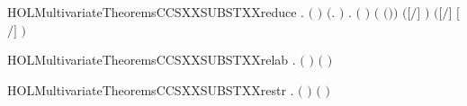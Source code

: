 \begin{SaveVerbatim}{HOLMultivariateTheoremsCCSXXSUBSTXXreduce}
\HOLTokenTurnstile{} \HOLSymConst{\HOLTokenForall{}}   .
       \HOLSymConst{\HOLTokenNeg{}}   \HOLSymConst{\HOLTokenConj{}}   \HOLSymConst{\HOLTokenConj{}} \ensuremath{(}  \HOLSymConst{\ensuremath{=}}  \ensuremath{)} \HOLSymConst{\HOLTokenConj{}}
        \ensuremath{(}\HOLTokenLambda{}.  \HOLConst{\HOLTokenNotIn{}}  \ensuremath{)}  \HOLSymConst{\HOLTokenImp{}}
       \HOLSymConst{\HOLTokenForall{}} .
            \ensuremath{(} \ensuremath{)} \ensuremath{(} \ensuremath{(}\HOLSymConst{::}\ensuremath{)}\ensuremath{)} \HOLSymConst{\HOLTokenConj{}} \ensuremath{(}\ensuremath{[}\ensuremath{/}\ensuremath{]}  \HOLSymConst{\ensuremath{=}} \ensuremath{)} \HOLSymConst{\HOLTokenImp{}}
           \ensuremath{(}\ensuremath{[}\HOLSymConst{::}\ensuremath{/}\HOLSymConst{::}\ensuremath{]}  \HOLSymConst{\ensuremath{=}} \ensuremath{[}\ensuremath{/}\ensuremath{]} \ensuremath{)}
\end{SaveVerbatim}
\newcommand{\HOLMultivariateTheoremsCCSXXSUBSTXXreduce}{\UseVerbatim{HOLMultivariateTheoremsCCSXXSUBSTXXreduce}}
\begin{SaveVerbatim}{HOLMultivariateTheoremsCCSXXSUBSTXXrelab}
\HOLTokenTurnstile{} \HOLSymConst{\HOLTokenForall{}}  .
         \ensuremath{(}  \ensuremath{)} \HOLSymConst{\ensuremath{=}}  \ensuremath{(}  \ensuremath{)} 
\end{SaveVerbatim}
\newcommand{\HOLMultivariateTheoremsCCSXXSUBSTXXrelab}{\UseVerbatim{HOLMultivariateTheoremsCCSXXSUBSTXXrelab}}
\begin{SaveVerbatim}{HOLMultivariateTheoremsCCSXXSUBSTXXrestr}
\HOLTokenTurnstile{} \HOLSymConst{\HOLTokenForall{}}  .   \ensuremath{(}  \ensuremath{)} \HOLSymConst{\ensuremath{=}}   \ensuremath{(}  \ensuremath{)}
\end{SaveVerbatim}
